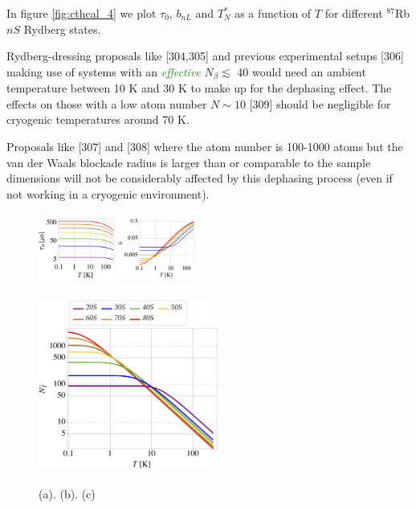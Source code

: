 \documentclass[10pt,twocolumn]{article}
\begin{document}
In figure \ref{fig:cthcal_4} we plot $\tau_0$, $b_{nL}$ and $T_N^*$ as a function of $T$ for different $^{87}$Rb $nS$ Rydberg states.

Rydberg-dressing proposals \textcolor{RoyalPurple}{like} [304,305] and previous experimental setups [306] making use of systems with an \textcolor{ForestGreen}{\textit{effective}} $N_{\beta}\lesssim$ 40 would need an ambient temperature between 10 K and 30 K to make up for the dephasing effect. The effects on those with a low atom number $N\sim 10$ [309] should be negligible for cryogenic temperatures around 70 K.

\textcolor{RoyalPurple}{Proposals like [307] and [308] where the atom number is 100-1000 atoms but the van der Waals blockade radius is larger than or comparable to the sample dimensions will not be considerably affected by this dephasing process (even if not working in a cryogenic environment).}

\begin{figure}[]
\begin{minipage}[c][6.4cm][t]{.14\textwidth}
  \vspace*{\fill}
  \centering
  \includegraphics[width=2.5cm,height=2.3cm]{tauloglog.png}
  \subcaption{}
  \label{fig:cthcal1_2}
  \vspace{0.3cm}
  \includegraphics[width=2.5cm,height=2.3cm]{bloglog.png}
  \subcaption{}
  \label{fig:cthcal2_2}
\end{minipage}
\begin{minipage}[r][6.4cm][t]{.33\textwidth}
  \vspace{\fill}
  \centering
  \includegraphics[width=5.9cm,height=5.7cm]{NTloglog2.png}
  \subcaption{}
  \label{fig:cthcal3_2}
\end{minipage}%
\caption{(a). (b). (c) }
\end{figure}
\end{document}

